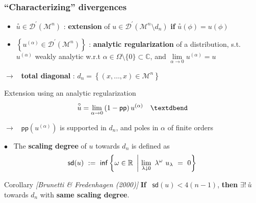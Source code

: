 \documentclass[9pt]{beamer}
\renewcommand{\inf}{\mathsf{inf}}
\newcommand{\pp}{\mathsf{pp}}
\newcommand{\sd}{\mathsf{sd}}
\newcommand{\exte}[1]{\overset{\circ}{#1}}
\newcommand{\citebeam}[1]{\textit{\textcolor{black!60!white}{[#1]}}}
\newcommand{\Dcal}{\mathcal{D}}
\newcommand{\Mcal}{\mathcal{M}}
\newcommand{\Cbb}{\mathbb{C}}
\newcommand{\Rbb}{\mathbb{R}}
\begin{document}
\begin{frame}[label=sd]

\frametitle{``Characterizing'' divergences}

\vfill

\begin{definition}
\vspace*{-10pt}
\begin{itemize}
\setlength\itemsep{2pt}

\item $\exte{u} \in \Dcal^\prime(\Mcal^n)$ : \textbf{extension} of $u \in \Dcal^\prime\left(\Mcal^n \setminus d_n \right)$ \textbf{if} $\exte{u}(\phi) = u(\phi)$

\item $\left\{ u^{(\alpha)} \in \Dcal^\prime(\Mcal^n) \right\}$ : \textbf{analytic regularization} of a distribution, s.t.\\[2pt]
$u^{(\alpha)}$ weakly analytic w.r.t $\alpha \in \Omega \setminus \{0\}\subset \Cbb$, and $\underset{\alpha\to 0}{\lim} u^{(\alpha)} = u$

\end{itemize}
\vspace*{-8pt}
\end{definition}

\vspace*{-3pt}
$\to$ \ \textbf{total diagonal} : $d_n = \left\{ (x,\dots,x) \in \Mcal^n \right\}$

\vfill

\begin{exampleblock}{Extension using an analytic regularization}
\vspace*{-22pt}
\begin{equation*}
\exte{u} = \lim_{\alpha \to 0} \left( 1 - \pp \right) u^{(\alpha)} \quad \textdbend
\vspace*{-7pt}
\end{equation*}
\end{exampleblock}

\vspace*{-4pt}
$\to$ \ $\pp \left(u^{(\alpha)}\right)$ is supported in $d_n$, and poles in $\alpha$ of finite orders

\vfill

$\bullet$ \ The \textbf{scaling degree} of $u$ towards $d_n$ is defined as \hfill \hyperlink{details_sd}{}
%
\vspace*{-5pt}
\begin{equation*}
\sd(u) \ := \ \inf\left\{ \omega \in \Rbb \ \left| \ \lim_{\lambda \downarrow 0} \ \lambda^\omega \ u_\lambda \ = \ 0 \right\} \right.
\vspace*{-8pt}
\end{equation*}

\begin{block}{Corollary \hfill \citebeam{Brunetti \& Fredenhagen (2000)}}
\vspace*{-6pt}
\textbf{If} \ $\sd(u) < 4(n-1)$, \textbf{then} $\exists ! \ \exte{u}$ towards $d_n$ with \textbf{same scaling degree}.
\end{block}

\vfill
 
\end{frame}
\end{document}

